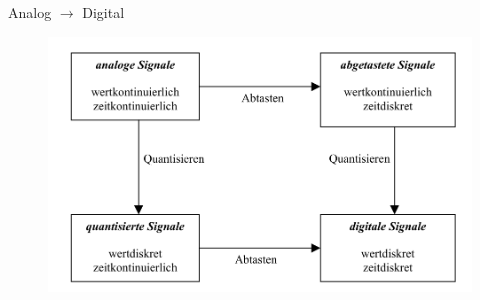 \documentclass[xcolor=dvipsnames,aspectratio=169]{beamer}
\begin{document}
\begin{frame}{Analog $\to$ Digital}
\vspace{-.74cm}
	\begin{figure}
	\centering
	\includegraphics[scale=0.28]{adda}
	\end{figure}
\end{frame}
\end{document}
